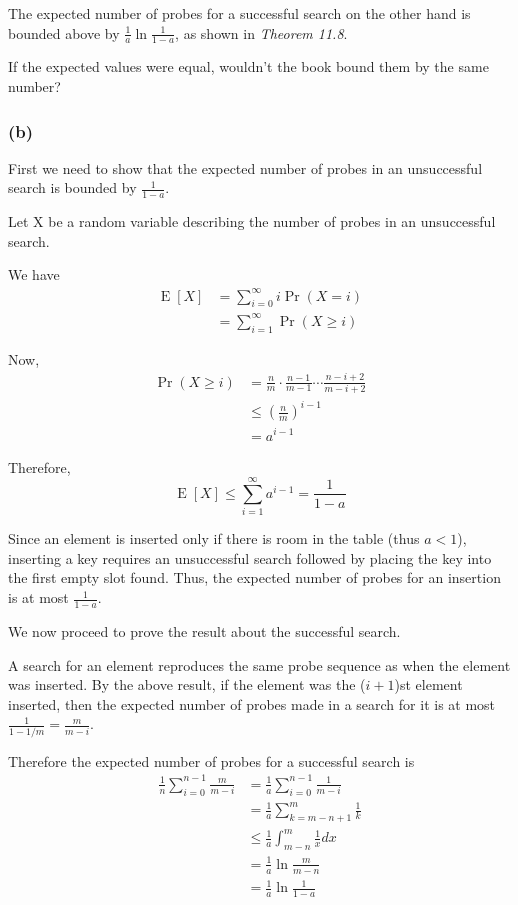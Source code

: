 \documentclass{article}
\DeclareMathOperator{\E}{\textrm{E}}
\begin{document}
The expected number of probes for a successful search on the other hand
is bounded above by \(\frac{1}{a} \ln\frac{1}{1-a}\),
as shown in \emph{Theorem 11.8}.

If the expected values were equal,
wouldn't the book bound them by the same number?

\subsubsection*{(b)}

First we need to show that the expected number of probes in an unsuccessful
search is bounded by \(\frac{1}{1-a}\).

Let X be a random variable describing
the number of probes in an unsuccessful search.

We have
\begin{align*}
    \E[X]
        &= \sum_{i = 0}^\infty i \Pr(X = i)\\
        &= \sum_{i = 1}^\infty \Pr(X \geq i)
\end{align*}

Now,
\begin{align*}
    \Pr(X \geq i)
        &= \frac{n}{m} \cdot \frac{n-1}{m-1} \cdots \frac{n-i+2}{m-i+2}\\
        &\leq \left( \frac{n}{m} \right) ^ {i-1}\\
        &= a^{i-1}
\end{align*}

Therefore,
\begin{equation*}
    \E[X] \leq \sum_{i = 1}^\infty a^{i-1} = \frac{1}{1-a}
\end{equation*}

Since an element is inserted only
if there is room in the table (thus \(a < 1\)),
inserting a key requires an unsuccessful search
followed by placing the key into the first empty slot found.
Thus, the expected number of probes for an insertion
is at most \(\frac{1}{1-a}\).

We now proceed to prove the result about the successful search.

A search for an element reproduces the same probe sequence
as when the element was inserted.
By the above result, if the element was the (\(i+1\))st element inserted,
then the expected number of probes made in a search for it
is at most \(\frac{1}{1 - 1/m} = \frac{m}{m-i}\).

Therefore the expected number of probes for a successful search is
\begin{align*}
    \frac{1}{n} \sum_{i=0}^{n-1} \frac{m}{m-i}
        &= \frac{1}{a} \sum_{i=0}^{n-1} \frac{1}{m-i}\\
        &= \frac{1}{a} \sum_{k=m-n+1}^m \frac{1}{k}\\
        &\leq \frac{1}{a} \int_{m-n}^m \frac{1}{x} dx\\
        &= \frac{1}{a} \ln\frac{m}{m-n}\\
        &= \frac{1}{a} \ln\frac{1}{1-a}
\end{align*}
\end{document}
